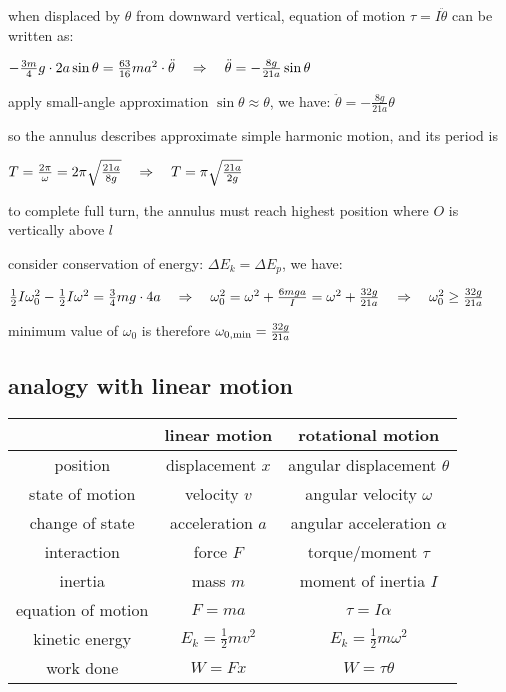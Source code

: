when displaced by $\theta$ from downward vertical, equation of motion $\tau = I \ddot{\theta} $ can be written as:

{

\centering

$ - \frac{3m}{4}g\cdot2a\sin\theta = \frac{63}{16}ma^2 \cdot \ddot{\theta} \quad \Rightarrow \quad \ddot{\theta} = -\frac{8g}{21a}\sin\theta$

}

apply small-angle approximation $\sin\theta\approx\theta$, we have: $\ddot{\theta} = -\frac{8g}{21a}\theta$

so the annulus describes approximate simple harmonic motion, and its period is

{
	
\centering

$T=\frac{2\pi}{\omega}=2\pi\sqrt{\frac{21a}{8g}} \quad \Rightarrow \quad T=\pi\sqrt{\frac{21a}{2g}}$

}

to complete full turn, the annulus must reach highest position where $O$ is vertically above $l$

consider conservation of energy: $\Delta E_k = \Delta E_p$, we have:

{
	
\centering
	
$ \frac{1}{2}I\omega_0^2 - \frac{1}{2}I\omega^2 = \frac{3}{4}mg\cdot 4a \quad \Rightarrow \quad \omega_0^2 = \omega^2 + \frac{6mga}{I} = \omega^2 + \frac{32g}{21a} \quad \Rightarrow \quad \omega_0^2 \geq \frac{32g}{21a}$
	
}

minimum value of $\omega_0$ is therefore $\omega_{0,\text{min}} = \frac{32g}{21a}$ \eoe

\subsection{analogy with linear motion}

\vspace*{0.5\baselineskip}

\begin{center}
	{\renewcommand{\arraystretch}{1.2}
	\renewcommand{\tabcolsep}{0.2cm}
	\begin{tabular}{|c|c|c|}
	\hline
	 & linear motion & rotational motion \\ \hline
	position & displacement $x$ & angular displacement $\theta$ \\ \hline
	state of motion & velocity $v$ & angular velocity $\omega$ \\ \hline
	change of state & acceleration $a$ & angular acceleration $\alpha$ \\ \hline
	interaction & force $F$ & torque/moment $\tau$ \\ \hline
	inertia & mass $m$ & moment of inertia $I$ \\ \hline \hline
	equation of motion & $F=ma$ & $\tau = I \alpha$ \\ \hline
	kinetic energy & $E_k = \frac{1}{2}mv^2$ & $E_k = \frac{1}{2}m\omega^2$ \\ \hline
	work done & $W=Fx$ & $W=\tau \theta$ \\ \hline
	\end{tabular}}
\end{center}